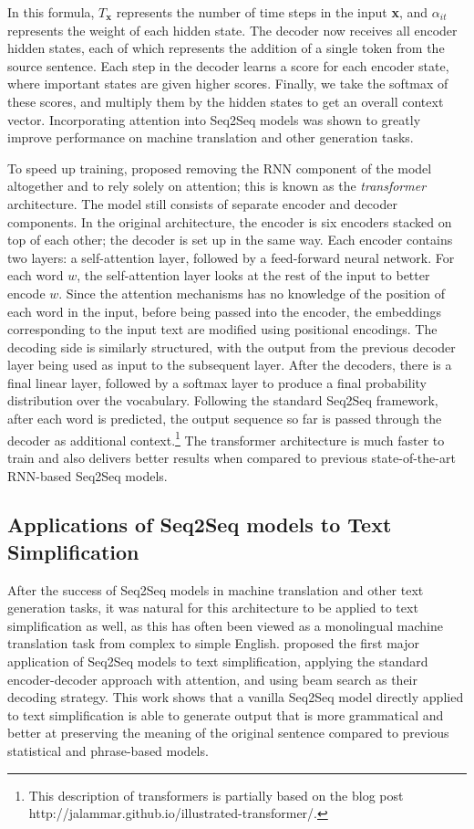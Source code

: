 \documentclass[thesis.tex]{subfiles}
\begin{document}
In this formula, $T_{\textbf{x}}$ represents the number of time steps in the input \textbf{x}, and $\alpha_{it}$ represents the weight of each hidden state. The decoder now receives all encoder hidden states, each of which represents the addition of a single token from the source sentence. Each step in the decoder learns a score for each encoder state, where important states are given higher scores. Finally, we take the softmax of these scores, and multiply them by the hidden states to get an overall context vector. Incorporating attention into Seq2Seq models was shown to greatly improve performance on machine translation and other generation tasks.

To speed up training, \cite{vaswani2017attention} proposed removing the RNN component of the model altogether and to rely solely on attention; this is known as the \textit{transformer} architecture. The model still consists of separate encoder and decoder components. In the original architecture, the encoder is six encoders stacked on top of each other; the decoder is set up in the same way. Each encoder contains two layers: a self-attention layer, followed by a feed-forward neural network. For each word $w$, the self-attention layer looks at the rest of the input to better encode $w$. Since the attention mechanisms has no knowledge of the position of each word in the input, before being passed into the encoder, the embeddings corresponding to the input text are modified using positional encodings. The decoding side is similarly structured, with the output from the previous decoder layer being used as input to the subsequent layer. After the decoders, there is a final linear layer, followed by a softmax layer to produce a final probability distribution over the vocabulary. Following the standard Seq2Seq framework, after each word is predicted, the output sequence so far is passed through the decoder as additional context.\footnote{This description of transformers is partially based on the blog post http://jalammar.github.io/illustrated-transformer/.} The transformer architecture is much faster to train and also delivers better results when compared to previous state-of-the-art RNN-based Seq2Seq models.

\subsection{Applications of Seq2Seq models to Text Simplification}

After the success of Seq2Seq models in machine translation and other text generation tasks, it was natural for this architecture to be applied to text simplification as well, as this has often been viewed as a monolingual machine translation task from complex to simple English. \cite{nisioi2017exploring} proposed the first major application of Seq2Seq models to text simplification, applying the standard encoder-decoder approach with attention, and using beam search as their decoding strategy. This work shows that a vanilla Seq2Seq model directly applied to text simplification is able to generate output that is more grammatical and better at preserving the meaning of the original sentence compared to previous statistical and phrase-based models.
\end{document}
